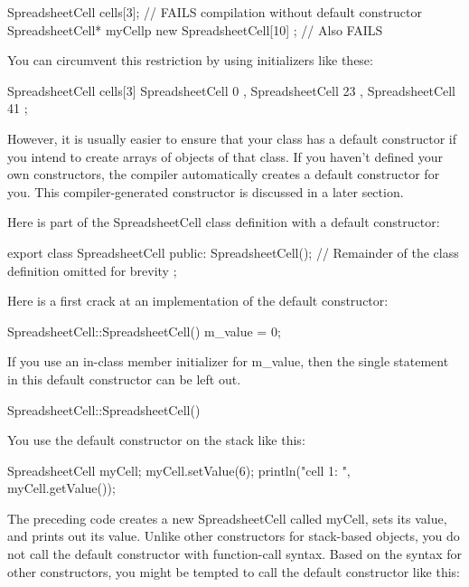 \begin{cpp}
SpreadsheetCell cells[3]; // FAILS compilation without default constructor
SpreadsheetCell* myCellp { new SpreadsheetCell[10] }; // Also FAILS
\end{cpp}

You can circumvent this restriction by using initializers like these:

\begin{cpp}
SpreadsheetCell cells[3] { SpreadsheetCell { 0 }, SpreadsheetCell { 23 },
    SpreadsheetCell { 41 } };
\end{cpp}

However, it is usually easier to ensure that your class has a default constructor if you intend to create arrays of objects of that class. If you haven’t defined your own constructors, the compiler automatically creates a default constructor for you. This compiler-generated constructor is discussed in a later section.


Here is part of the SpreadsheetCell class definition with a default constructor:

\begin{cpp}
export class SpreadsheetCell
{
    public:
        SpreadsheetCell();
        // Remainder of the class definition omitted for brevity
};
\end{cpp}

Here is a first crack at an implementation of the default constructor:

\begin{cpp}
SpreadsheetCell::SpreadsheetCell()
{
    m_value = 0;
}
\end{cpp}

If you use an in-class member initializer for m\_value, then the single statement in this default constructor can be left out.

\begin{cpp}
SpreadsheetCell::SpreadsheetCell()
{}
\end{cpp}

You use the default constructor on the stack like this:

\begin{cpp}
SpreadsheetCell myCell;
myCell.setValue(6);
println("cell 1: {}", myCell.getValue());
\end{cpp}

The preceding code creates a new SpreadsheetCell called myCell, sets its value, and prints out its value. Unlike other constructors for stack-based objects, you do not call the default constructor with function-call syntax. Based on the syntax for other constructors, you might be tempted to call the default constructor like this:

